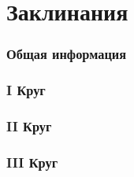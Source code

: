 \documentclass[10pt,twoside,twocolumn,openany]{book}
\begin{document}
\part{Заклинания}
\section{Общая информация}
\lipsum[1]
\section{\textrm{I} Круг}
\lipsum[1]
\section{\textrm{II} Круг}
\lipsum[1]
\section{\textrm{III} Круг}
\lipsum[1]
\end{document}
